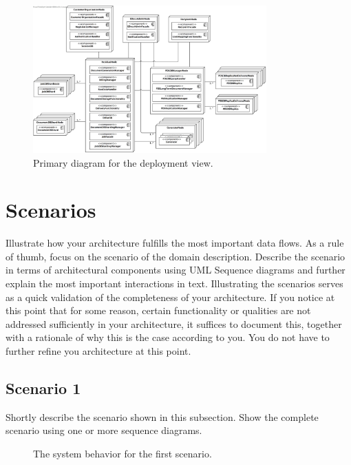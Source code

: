 \documentclass[a4paper,10pt]{article}
\begin{document}
\begin{figure}[!htp]
    \centering
	\includegraphics[width=0.8\textwidth]{TotalDeployment.png}
    \caption{Primary diagram for the deployment view.}
    \label{fig:depl_primary}
\end{figure}

\section{Scenarios}\label{sec:scenarios}
Illustrate how your architecture fulfills the most important data flows.
As a rule of thumb, focus on the scenario of the domain description.
Describe the scenario in terms of architectural components using UML Sequence
diagrams and further explain the most important interactions in text.
Illustrating the scenarios serves as a quick validation of the completeness of
your architecture.
If you notice at this point that for some reason, certain functionality or
qualities are not addressed sufficiently in your architecture, it suffices to
document this, together with a rationale of why this is the case according to
you.
You do not have to further refine you architecture at this point.

\subsection{Scenario 1}
Shortly describe the scenario shown in this subsection.
Show the complete scenario using one or more sequence diagrams.

\begin{figure}[!htp]
    \centering
    \caption{The system behavior for the first scenario.
        }\label{fig:seq_scenario1}
\end{figure}
\end{document}
